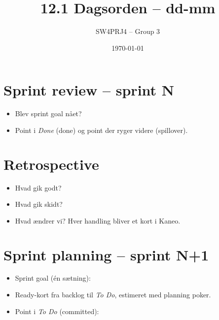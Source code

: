 \documentclass[a4paper,11pt]{article}
\title{12.1 Dagsorden -- dd-mm}
\author{SW4PRJ4 -- Group 3}
\date{\today}
\begin{document}
\maketitle


\section*{Sprint review -- sprint N}
\begin{itemize}
    \item Blev sprint goal nået?
    \item Point i \emph{Done} (done) og point der ryger videre (spillover).
\end{itemize}

\section*{Retrospective}
\begin{itemize}
    \item Hvad gik godt?
    \item Hvad gik skidt?
    \item Hvad ændrer vi? Hver handling bliver et kort i Kaneo.
\end{itemize}

\section*{Sprint planning -- sprint N+1}
\begin{itemize}
    \item Sprint goal (én sætning):
    \item Ready-kort fra backlog til \emph{To Do}, estimeret med planning poker.
    \item Point i \emph{To Do} (committed):
\end{itemize}
\end{document}
